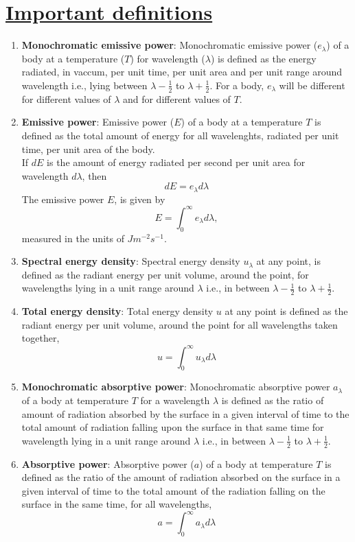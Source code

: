 \documentclass[14pt,a4paper]{article}
\begin{document}
\section{\underline{Important definitions }}
\begin{enumerate}
	\item \textbf{Monochromatic emissive power}: Monochromatic emissive power ($e_{\lambda}$) of a body at a temperature ($T$) for wavelength ($\lambda$) is defined as the energy radiated, in vaccum, per unit time, per unit area and per unit range around wavelength i.e., lying between $\lambda-\frac{1}{2}$ to $\lambda+\frac{1}{2}$. For a body, $e_{\lambda}$ will be different for different values of $\lambda$ and for different values of $T$.
	\item \textbf{Emissive power}: Emissive power ($E$) of a body at a temperature $T$ is defined as the total amount of energy for all wavelenghts, radiated per unit time, per unit area of the body.
	\\
	If $dE$ is the amount of energy radiated per second per unit area for wavelength $d\lambda$, then
	\begin{equation}
		dE = e_{\lambda}d\lambda
	\end{equation}
	The emissive power $E$, is given by
	\begin{equation}
		E = \int_{0}^{\infty} e_{\lambda}d\lambda,
	\end{equation}
	measured in the units of $Jm^{-2}s^{-1}$.
	
	\item \textbf{Spectral energy density}: Spectral energy density $u_{\lambda}$ at any point, is defined as the radiant energy per unit volume, around the point, for wavelengths lying in a unit range around $\lambda$ i.e., in between $\lambda-\frac{1}{2}$ to $\lambda+\frac{1}{2}$.
	\item \textbf{Total energy density}: Total energy density $u$ at any point is defined as the radiant energy per unit volume, around the point for all wavelengths taken together,
	\begin{equation}
		u = \int_{0}^{\infty} u_{\lambda}d\lambda
	\end{equation}
	
	\item \textbf{Monochromatic absorptive power}: Monochromatic absorptive power $a_{\lambda}$ of a body at temperature $T$ for a wavelength $\lambda$ is defined as the ratio of amount of radiation absorbed by the surface in a given interval of time to the total amount of radiation falling upon the surface in that same time for wavelength lying in a unit range around $\lambda$ i.e., in between $\lambda-\frac{1}{2}$ to $\lambda+\frac{1}{2}$.
	\item \textbf{Absorptive power}: Absorptive power ($a$) of a body at temperature $T$ is defined as the ratio of the amount of radiation absorbed on the surface in a given interval of time to the total amount of the radiation falling on the surface in the same time, for all wavelengths,
	\begin{equation}
		a = \int_{0}^{\infty}a_{\lambda}d\lambda
	\end{equation}
	
\end{enumerate}
	
\end{document}
